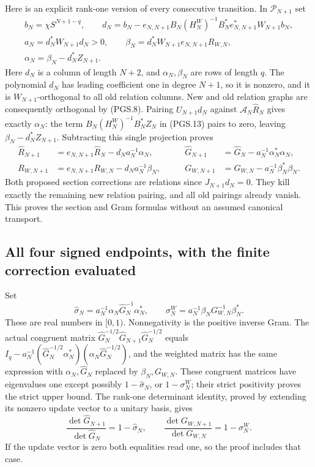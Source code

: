 Here is an explicit rank-one version of every consecutive transition.
In \(\mathcal P_{N+1}\) set
\[
\begin{gathered}
 b_N=\chi S^{N+1-q},\qquad
 d_N=b_N-e_{N,N+1}B_N(H_N^W)^{-1}
                 B_N^*e_{N,N+1}^*W_{N+1}b_N,\\
 a_N=d_N^*W_{N+1}d_N>0,\qquad
 \beta_N=d_N^*W_{N+1}e_{N,N+1}R_{W,N},\\
 \alpha_N=\beta_N-d_N^*Z_{N+1}.
\end{gathered}
\tag{PGS.25}\label{GraphV2:eq:pgs-step-data}
\]
Here \(d_N\) is a column of length \(N+2\), and
\(\alpha_N,\beta_N\) are rows of length \(q\). The polynomial
\(d_N\) has leading coefficient one in degree \(N+1\), so it
is nonzero, and it is \(W_{N+1}\)-orthogonal to all old relation
columns. New and old relation graphs are consequently orthogonal
by (PGS.8). Pairing \(U_{N+1}d_N\) against
\(\mathcal A_N\widehat R_N\) gives exactly \(\alpha_N\):
the term \(B_N(H_N^W)^{-1}B_N^*Z_N\) in (PGS.13) pairs to
zero, leaving \(\beta_N-d_N^*Z_{N+1}\).
Subtracting this single projection proves
\[
\begin{aligned}
 \widehat R_{N+1}
    &=e_{N,N+1}\widehat R_N-d_Na_N^{-1}\alpha_N,\qquad
 &\widehat G_{N+1}
    &=\widehat G_N-a_N^{-1}\alpha_N^*\alpha_N,\\
 R_{W,N+1}
    &=e_{N,N+1}R_{W,N}-d_Na_N^{-1}\beta_N,\qquad
 &G_{W,N+1}
    &=G_{W,N}-a_N^{-1}\beta_N^*\beta_N.
\end{aligned}
\tag{PGS.26}\label{GraphV2:eq:pgs-rank-one}
\]
Both proposed section corrections are relations since
\(J_{N+1}d_N=0\). They kill exactly the remaining new relation
pairing, and all old pairings already vanish. This proves the
section and Gram formulas without an assumed canonical transport.

\subsection{All four signed endpoints, with the finite correction evaluated}

Set
\[
 \widehat\sigma_N=
    a_N^{-1}\alpha_N\widehat G_N^{-1}\alpha_N^*,\qquad
 \sigma_N^W=a_N^{-1}\beta_NG_{W,N}^{-1}\beta_N^*.
\tag{PGS.27}\label{GraphV2:eq:pgs-sigmas}
\]
These are real numbers in \([0,1)\). Nonnegativity is the
positive inverse Gram. The actual congruent matrix
\(\widehat G_N^{-1/2}\widehat G_{N+1}\widehat G_N^{-1/2}\)
equals \(I_q-a_N^{-1}(\widehat G_N^{-1/2}\alpha_N^*)
(\alpha_N\widehat G_N^{-1/2})\), and the weighted matrix has
the same expression with \(\alpha_N,\widehat G_N\) replaced by
\(\beta_N,G_{W,N}\). These congruent matrices have eigenvalues
one except possibly \(1-\widehat\sigma_N\), or
\(1-\sigma_N^W\); their strict positivity proves the strict upper
bound. The rank-one determinant identity, proved by extending its
nonzero update vector to a unitary basis, gives
\[
 \frac{\det\widehat G_{N+1}}{\det\widehat G_N}
       =1-\widehat\sigma_N,\qquad
 \frac{\det G_{W,N+1}}{\det G_{W,N}}
       =1-\sigma_N^W.
\tag{PGS.28}\label{GraphV2:eq:pgs-step-determinants}
\]
If the update vector is zero both equalities read one, so the proof
includes that case.

